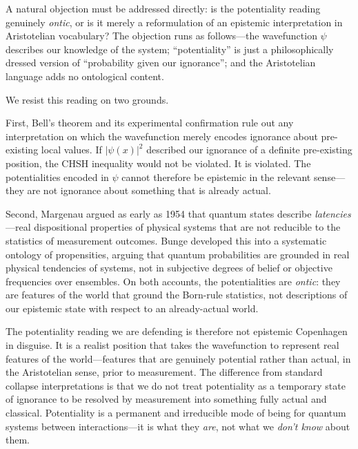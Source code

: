 \medskip


\medskip

A natural objection must be addressed directly: is the potentiality reading genuinely \textit{ontic}, or is it merely a reformulation of an epistemic interpretation in Aristotelian vocabulary? The objection runs as follows---the wavefunction $\psi$ describes our knowledge of the system; ``potentiality'' is just a philosophically dressed version of ``probability given our ignorance''; and the Aristotelian language adds no ontological content. 

\medskip

We resist this reading on two grounds.

\medskip

First, Bell's theorem \cite{bell_1964_epr} and its experimental confirmation \cite{aspect_1982_bell,hensen_2015_loophole} rule out any interpretation on which the wavefunction merely encodes ignorance about pre-existing local values. If $|\psi(x)|^2$ described our ignorance of a definite pre-existing position, the CHSH inequality would not be violated. It is violated. The potentialities encoded in $\psi$ cannot therefore be epistemic in the relevant sense---they are not ignorance about something that is already actual.

\medskip

Second, Margenau argued as early as 1954 \cite{margenau_1954_interpretations} that quantum states describe \textit{latencies}---real dispositional properties of physical systems that are not reducible to the statistics of measurement outcomes. Bunge \cite{bunge_1979_ontology} developed this into a systematic ontology of propensities, arguing that quantum probabilities are grounded in real physical tendencies of systems, not in subjective degrees of belief or objective frequencies over ensembles. On both accounts, the potentialities are \textit{ontic}: they are features of the world that ground the Born-rule statistics, not descriptions of our epistemic state with respect to an already-actual world.

\medskip

The potentiality reading we are defending is therefore not epistemic Copenhagen in disguise. It is a realist position that takes the wavefunction to represent real features of the world---features that are genuinely potential rather than actual, in the Aristotelian sense, prior to measurement. The difference from standard collapse interpretations is that we do not treat potentiality as a temporary state of ignorance to be resolved by measurement into something fully actual and classical. Potentiality is a permanent and irreducible mode of being for quantum systems between interactions---it is what they \textit{are}, not what we \textit{don't know} about them.

